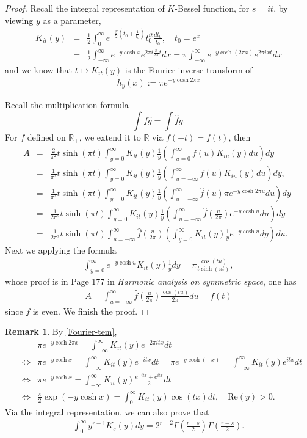 \documentclass[11pt,reqno]{amsart}
\newcommand{\bea}{\begin{eqnarray}}
\newcommand{\eea}{\end{eqnarray}}
\newcommand{\bna}{\begin{eqnarray*}}
\newcommand{\ena}{\end{eqnarray*}}
\def\re{{\mathrm{Re}}}
\def\R{\mathbb{R}}
\theoremstyle{definition}
\newtheorem{remark}{Remark}
\begin{document}
\begin{proof}
Recall the integral representation of $K$-Bessel function, for $s=it$,
by viewing $y$ as a parameter,
\bna
K_{it}(y)&=&
\frac{1}{2}\int_0^\infty e^{-\frac{y}{2}(t_0+\frac{1}{t_0})}t_0^{it}\frac{dt_0}{t_0},\quad t_0=e^x\\
&=&
\frac{1}{2}\int_{-\infty}^\infty e^{-y\cosh x}e^{2\pi i\frac{x}{2\pi}t} dx
=
\pi\int_{-\infty}^\infty e^{-y\cosh (2\pi x)}e^{2\pi i xt} dx
\ena
and we know that $t\mapsto K_{it}(y)$ is the Fourier inverse transform  of
\bea
h_y(x):=\pi e^{-y\cosh 2\pi x}\label{Fourier-tem}
\eea


Recall the multiplication formula $$\int f\hat g=\int \hat f g.$$
For $f$ defined on $\R_+$, we extend it to $\R$ via $f(-t)=f(t)$, then
\bna
A&=&\frac{2}{\pi^2}t\sinh(\pi t)\int_{y=0}^\infty K_{it}(y)\frac{1}{y}
\left(\int_{u=0}^\infty f(u) K_{iu}(y)du\right)dy\\
&=&\frac{1}{\pi^2}t\sinh(\pi t)\int_{y=0}^\infty K_{it}(y)\frac{1}{y}
\left(\int_{u=-\infty}^\infty f(u) K_{iu}(y)du\right)dy,\quad\\
&=&\frac{1}{\pi^2}t\sinh(\pi t)\int_{y=0}^\infty K_{it}(y)\frac{1}{y}
\left(\int_{u=-\infty}^\infty \widehat f(u) \pi e^{-y\cosh 2\pi u}du\right)dy\\
&=&\frac{1}{2\pi^2}t\sinh(\pi t)\int_{y=0}^\infty K_{it}(y)\frac{1}{y}
\left(\int_{u=-\infty}^\infty \widehat f(\frac{u}{2\pi}) e^{-y\cosh  u}du\right)dy\\
&=&\frac{1}{2\pi^2}t\sinh(\pi t)
\int_{u=-\infty}^\infty \widehat f(\frac{u}{2\pi})
\left(\int_{y=0}^\infty K_{it}(y)\frac{1}{y}e^{-y\cosh  u} dy \right)du.
\ena
Next we applying the formula
\bea
\int_{y=0}^\infty e^{-y\cosh u}K_{it}(y)\frac{1}{y}dy=\pi\frac{\cos(tu)}{t\sinh(\pi t)}
\label{some-formula},
\eea
whose proof is in Page 177 in {\it Harmonic analysis on symmetric space},
one has
\bna
A=\int_{u=-\infty}^\infty\widehat f(\frac{u}{2\pi})\frac{\cos(tu)}{2\pi}du
=f(t)
\ena
since $f$ is even. We finish the proof.
\end{proof}
\begin{remark}

By \eqref{Fourier-tem},
\bna
&&\pi e^{-y\cosh 2\pi x}=\int_{-\infty}^\infty K_{it}(y)e^{-2\pi i t x}dt\\
&\Leftrightarrow&\pi e^{-y\cosh x}=\int_{-\infty}^\infty K_{it}(y)e^{-i t x}dt
=\pi e^{-y\cosh (-x)}=\int_{-\infty}^\infty K_{it}(y)e^{i t x}dt\\
&\Leftrightarrow&
\pi e^{-y\cosh x}=\int_{-\infty}^\infty K_{it}(y)\frac{ e^{-itx}+ e^{itx}}{2}dt\\
&\Leftrightarrow&\frac{\pi}{2}\exp(-y\cosh x)=\int_0^\infty K_{it}(y)\cos(tx)dt,\quad \re(y)>0.
\ena
Via the integral representation, we can also prove that
\bna
\int_0^\infty y^{r-1}K_{s}(y)dy=2^{r-2}\Gamma\left(\frac{r+s}{2}\right)\Gamma\left(\frac{r-s}{2}\right).
\ena

\end{remark}
\end{document}
